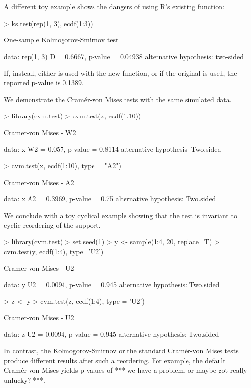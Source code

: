 A different toy example shows the dangers of using R's existing
 function:
\begin{Schunk}
\begin{Sinput}
> ks.test(rep(1, 3), ecdf(1:3))
\end{Sinput}
\begin{Soutput}
	One-sample Kolmogorov-Smirnov test

data:  rep(1, 3) 
D = 0.6667, p-value = 0.04938
alternative hypothesis: two-sided 
\end{Soutput}
\end{Schunk}
If, instead, either  is used with the new
 function, or if the original 
is used, the reported p-value is 0.1389.

We demonstrate the Cram\'{e}r-von Mises tests with the same
simulated data. 
\begin{Schunk}
\begin{Sinput}
> library(cvm.test)
> cvm.test(x, ecdf(1:10))
\end{Sinput}
\begin{Soutput}
	Cramer-von Mises - W2

data:  x 
W2 = 0.057, p-value = 0.8114
alternative hypothesis: Two.sided 
\end{Soutput}
\begin{Sinput}
> cvm.test(x, ecdf(1:10), type = "A2")
\end{Sinput}
\begin{Soutput}
	Cramer-von Mises - A2

data:  x 
A2 = 0.3969, p-value = 0.75
alternative hypothesis: Two.sided 
\end{Soutput}
\end{Schunk}

We conclude with a toy cyclical example showing that the test is
invariant to cyclic reordering of the support.
\begin{Schunk}
\begin{Sinput}
> library(cvm.test)
> set.seed(1)
> y <- sample(1:4, 20, replace=T)
> cvm.test(y, ecdf(1:4), type='U2')
\end{Sinput}
\begin{Soutput}
	Cramer-von Mises - U2

data:  y 
U2 = 0.0094, p-value = 0.945
alternative hypothesis: Two.sided 
\end{Soutput}
\begin{Sinput}
> z <- y%
> cvm.test(z, ecdf(1:4), type = 'U2')
\end{Sinput}
\begin{Soutput}
	Cramer-von Mises - U2

data:  z 
U2 = 0.0094, p-value = 0.945
alternative hypothesis: Two.sided 
\end{Soutput}
\end{Schunk}
In contrast, the Kolmogorov-Smirnov or the standard Cram\'{e}r-von Mises tests
produce different results after such a reordering. For example, the default
Cram\'{e}r-von Mises yields p-values of 
*** we have a problem, or maybe got really unlucky? ***.




